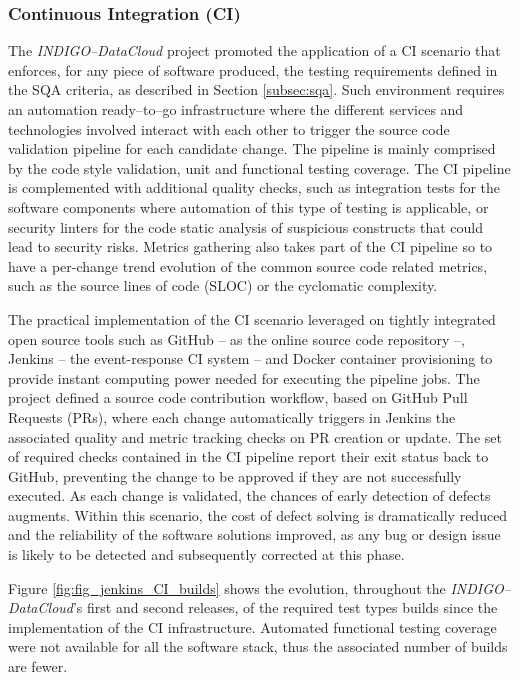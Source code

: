 \documentclass[journal]{IEEEtran}
\begin{document}
\subsubsection{Continuous Integration (CI)}
\label{subsec:ci}
The {\sl INDIGO--DataCloud} project promoted the application of a CI scenario that enforces,
for any piece of software produced, the testing requirements defined in the SQA criteria,
as described in Section \ref{subsec:sqa}. Such environment requires an automation
ready--to--go infrastructure where the different services and technologies involved interact with each
other to trigger the source code validation pipeline for each candidate change. The
pipeline is mainly comprised by the code style validation, unit and functional testing
coverage. The CI pipeline is complemented with additional quality checks, such as 
integration tests for the software components where automation of this type of testing
is applicable, or security linters for the code static analysis of suspicious
constructs that could lead to security risks. Metrics gathering also takes part of
the CI pipeline so to have a per-change trend evolution of the common source code 
related metrics, such as the source lines of code (SLOC) or the cyclomatic complexity. 

The practical implementation of the CI scenario leveraged on tightly integrated open
source tools such as GitHub \cite{github} -- as the online source code repository --,
Jenkins \cite{jenkins} -- the event-response CI system -- and Docker container
provisioning to provide instant computing power needed for executing the pipeline jobs. 
The project defined a source code contribution workflow, based on GitHub Pull Requests 
(PRs), where each change automatically triggers in Jenkins the associated quality and
metric tracking checks on PR creation or update. The set of required checks contained
in the CI pipeline report their exit status back to GitHub, preventing the change to be
approved if they are not successfully executed. As each change is validated, the chances
of early detection of defects augments. Within this scenario, the cost of defect solving
is dramatically reduced and the reliability of the software solutions improved, as any
bug or design issue is likely to be detected and subsequently corrected at this phase.

Figure \ref{fig:fig_jenkins_CI_builds} shows the evolution, throughout the 
{\sl INDIGO--DataCloud}'s first and second releases, of the required test types builds since the
implementation of the CI infrastructure. Automated functional testing coverage were not
available for all the software stack, thus the associated number of builds are fewer.
\end{document}
